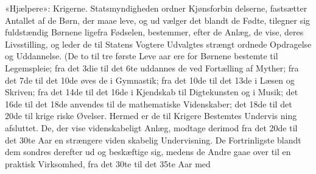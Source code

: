 \documentclass[12pt,a4paper]{book}
\newcommand{\gk}[1]{\textit{#1}}
\begin{document}
«Hjælpere»: Krigerne. Statsmyndigheden ordner Kjønsforbin\-%
delserne, fastsætter Antallet af de Børn, der maae leve, og ud\-%
vælger det blandt de Fødte, tilegner sig fuldstændig Børnene
ligefra Fødselen, bestemmer, efter de Anlæg, de vise, deres
Livsstilling, og leder de til Statens Vogtere Udvalgtes strængt
ordnede Opdragelse og Uddannelse. (De to til tre første Leve\-%
aar ere for Børnene bestemte til Legemspleie; fra det 3die til
det 6te uddannes de ved Fortælling af Myther; fra det 7de
til det 10de øves de i Gymnastik; fra det 10de til det 13de
i Læsen og Skriven; fra det 14de til det 16de i Kjendskab til
Digtekunsten og i Musik; det 16de til det 18de anvendes til
de mathematiske Videnskaber; det 18de til det 20de til krige\-%
riske Øvelser. Hermed er de til Krigere Bestemtes Undervis\-%
ning afsluttet. De, der vise videnskabeligt Anlæg, modtage
derimod fra det 20de til det 30te Aar en strængere viden\-%
skabelig Undervisning. De Fortrinligste blandt dem sondres
derefter ud og beskæftige sig, medens de Andre gaae over til
en praktisk Virksomhed, fra det 30te til det 35te Aar med
\end{document}
